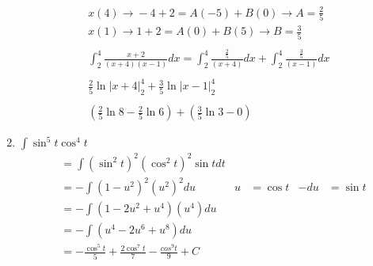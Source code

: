 \documentclass[12pt]{article}
\begin{document}
\begin{enumerate}
\begin{align*}
             x(4) \xrightarrow{} -4+2=A(-5)+B(0) \xrightarrow{} A=\frac{2}{5}\\
             x(1) \xrightarrow{} 1+2= A(0)+B(5) \xrightarrow{} B=\frac{3}{5}\\\\
             \int_{2}^{4}\frac{x+2}{(x+4)(x-1)}dx = \int_{2}^{4}\frac{\frac{2}{5}}{(x+4)}dx+\int_{2}^{4}\frac{\frac{3}{5}}{(x-1)}dx\\\\
             \frac{2}{5}\ln{\Big|x+4\Big|}_2^4+\frac{3}{5}\ln{
             \Big|x-1\Big|}_2^4\\\\
             \left(\frac{2}{5}\ln{8} - \frac{2}{5}\ln{6}\right) + \left(\frac{3}{5}\ln{3}-0\right) 
         \end{align*}
    \addtocounter{enumi}{3}\item $\int\sin^5{t}\cos^4t$
        \begin{align*}
            &=\int (\sin^2t)^2(\cos^2t)^2\sin{t}dt \\
            &= -\int (1-u^2)^2(u^2)^2du &u &= \cos{t} &-du &= \sin{t}\\
            &=-\int (1-2u^2+u^4)(u^4)du \\
            &=-\int (u^4-2u^6+u^8)du \\
            &=-\frac{\cos^5t}{5}+\frac{2\cos^7t}{7}-\frac{cos^9t}{9}+C
        \end{align*}
    

\end{enumerate}
\end{document}
